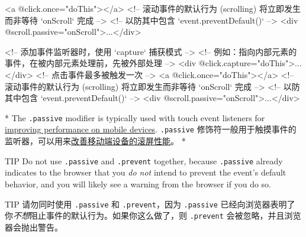 \begin{paracol}{2}
\begin{codeHtml}
<a @click.once="doThis"></a>
<!-- 滚动事件的默认行为 (scrolling) 将立即发生而非等待 `onScroll` 完成 -->
<!-- 以防其中包含 `event.preventDefault()` -->
<div @scroll.passive="onScroll">...</div>
\end{codeHtml}
\switchcolumn
\begin{codeHtml}
<!-- 添加事件监听器时，使用 `capture` 捕获模式 -->
<!-- 例如：指向内部元素的事件，在被内部元素处理前，先被外部处理 -->
<div @click.capture="doThis">...</div>
<!-- 点击事件最多被触发一次 -->
<a @click.once="doThis"></a>
<!-- 滚动事件的默认行为 (scrolling) 将立即发生而非等待 `onScroll` 完成 -->
<!-- 以防其中包含 `event.preventDefault()` -->
<div @scroll.passive="onScroll">...</div>
\end{codeHtml}


\switchcolumn[0]*%
The \texttt{.passive} modifier is typically used with touch event
listeners for
\href{https://developer.mozilla.org/en-US/docs/Web/API/EventTarget/addEventListener\#improving_scroll_performance_using_passive_listeners}{improving
performance on mobile devices}.
\switchcolumn
\texttt{.passive}
修饰符一般用于触摸事件的监听器，可以用来\href{https://developer.mozilla.org/zh-CN/docs/Web/API/EventTarget/addEventListener\#使用_passive_改善滚屏性能}{改善移动端设备的滚屏性能}。
\switchcolumn[0]*%
\begin{vueQuote}{TIP}
Do not use \texttt{.passive} and \texttt{.prevent} together, because
\texttt{.passive} already indicates to the browser that you \emph{do
not} intend to prevent the event's default behavior, and you will likely
see a warning from the browser if you do so.
\end{vueQuote}
\switchcolumn
\begin{vueQuote}{TIP}
请勿同时使用 \texttt{.passive} 和 \texttt{.prevent}，因为
\texttt{.passive}
已经向浏览器表明了你\emph{不想}阻止事件的默认行为。如果你这么做了，则
\texttt{.prevent} 会被忽略，并且浏览器会抛出警告。
\end{vueQuote}
\end{paracol}

